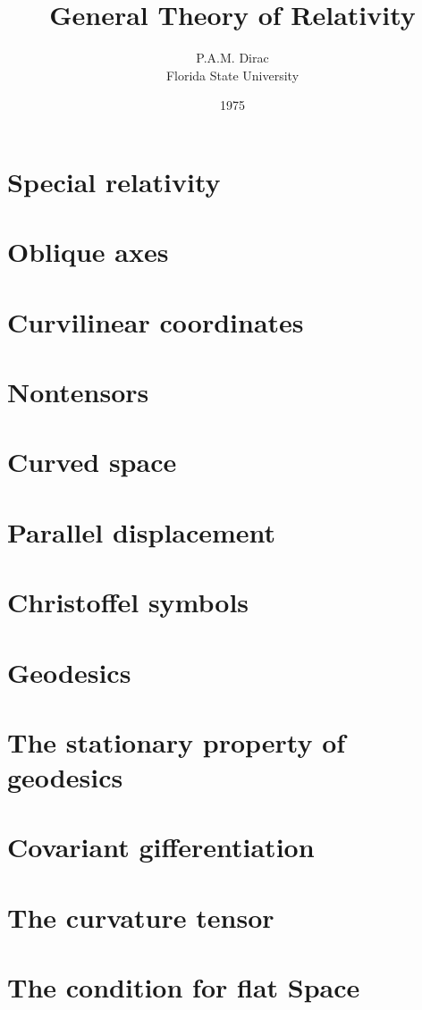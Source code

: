 \documentclass[10pt]{article}
\title{General Theory of Relativity}
\author{P.A.M. Dirac\\Florida State University}
\date{1975}
\numberwithin{equation}{section}
\begin{document}
\maketitle
\section{Special relativity}

\section{Oblique axes}

\section{Curvilinear coordinates}

\section{Nontensors}

\section{Curved space}

\section{Parallel displacement}

\section{Christoffel symbols}

\section{Geodesics}

\section{The stationary property of geodesics}

\section{Covariant gifferentiation}

\section{The curvature tensor}

\section{The condition for flat Space}

\end{document}
